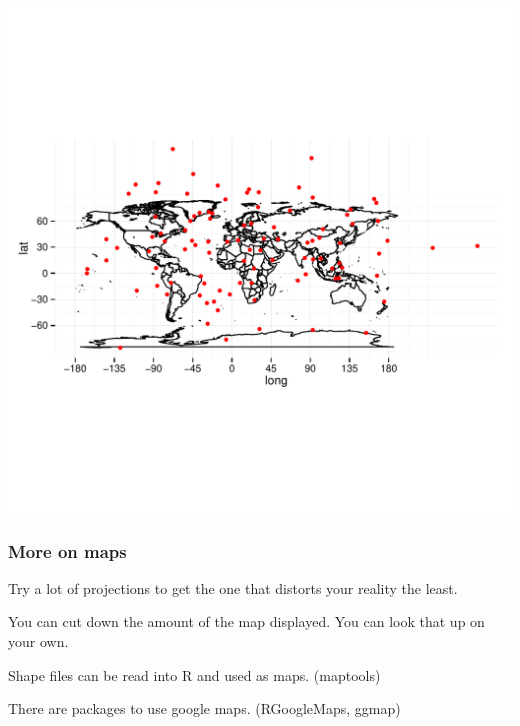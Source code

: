 \documentclass{beamer}\usepackage{graphicx, color}
\makeatletter
\def\maxwidth{ %
  \ifdim\Gin@nat@width>\linewidth
    \linewidth
  \else
    \Gin@nat@width
  \fi
}
\newenvironment{knitrout}{}{} %
\makeatother
\begin{document}
\begin{frame}
\begin{knitrout}\scriptsize
{}\color{fgcolor}
\includegraphics[width=\maxwidth]{figure/unnamed-chunk-12} 

\end{knitrout}

\end{frame}

\begin{frame}
  \frametitle{More on maps}

  Try a lot of projections to get the one that distorts your reality the least.

  You can cut down the amount of the map displayed. You can look that up on your own.

  Shape files can be read into R and used as maps. (maptools)

  There are packages to use google maps. (RGoogleMaps, ggmap)

\end{frame}
\end{document}
